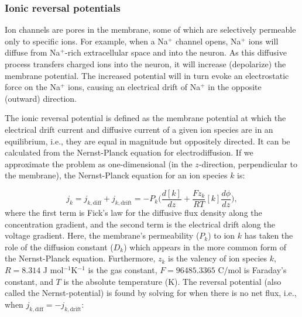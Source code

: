 \subsubsection{Ionic reversal potentials}
Ion channels are pores in the membrane, some of which are selectively permeable only to specific ions. For example, when a Na$^+$ channel opens, Na$^+$ ions will diffuse from Na$^+$-rich extracellular space and into the neuron. As this diffusive process transfers charged ions into the neuron, it will increase (depolarize) the membrane potential. The increased potential will in turn evoke an electrostatic force on the Na$^+$ ions, causing an electrical drift of Na$^+$ in the opposite (outward) direction. 

The ionic reversal potential is defined as the membrane potential at which the electrical drift current and diffusive current of a given ion species are in an equilibrium, i.e., they are equal in magnitude but oppositely directed. It can be calculated from the Nernst-Planck equation for electrodiffusion. If we approximate the problem as one-dimensional (in the $z$-direction, perpendicular to the membrane), the Nernst-Planck equation for an ion species $k$ is:

\begin{equation}
j_k = j_{k,\text{diff}} + j_{k,\text{drift}} 
=  - P_k \Big(\frac{d[k]}{dz} +  \frac{Fz_k}{RT}  [k] \frac{d\phi}{dz} \Big), 
\label{eq:NP1D}
\end{equation}
where the first term is Fick's law for the diffusive flux density along the concentration gradient, and the second term is the electrical drift along the voltage gradient. Here, the membrane's permeability ($P_k$) to ion $k$ has taken the role of the diffusion constant ($D_k$) which appears in the more common form of the Nernst-Planck equation. Furthermore, $z_{k}$ is the valency of ion species $k$, $R = 8.314$ J mol$^{-1}$K$^{-1}$ is the gas constant, $F = 96485.3365$ C/mol is Faraday's constant, and $T$ is the absolute temperature (K). The reversal potential (also called the Nernst-potential) is found by solving for when there is no net flux, i.e., when  $j_{k,\text{diff}} = - j_{k,\text{drift}}$:

